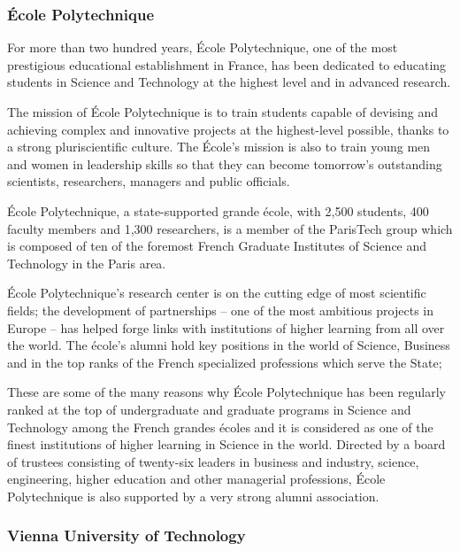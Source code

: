\documentclass[12pt]{article}
\begin{document}
\subsubsection{\'{E}cole Polytechnique}

For more than two hundred years, \'{E}cole Polytechnique, one of the most prestigious educational establishment in France,
has been dedicated to educating students in Science and Technology at the highest level and in advanced research.

The mission of \'{E}cole Polytechnique is to train students capable of devising and achieving
complex and innovative projects at the highest-level possible, thanks to a strong pluriscientific culture.
The \'{E}cole's mission is also to train young men and women in leadership skills so that
they can become tomorrow's outstanding scientists, researchers, managers and public officials.

\'{E}cole Polytechnique, a state-supported grande \'{e}cole, with 2,500 students, 400 faculty members
and 1,300 researchers, is a member of the ParisTech group which is composed of ten of the
foremost French Graduate Institutes of Science and Technology in the Paris area.

\'{E}cole Polytechnique's research center is on the cutting edge of most scientific fields; the development of partnerships -- one of the most ambitious projects in Europe -- has helped forge links with institutions of higher learning from all over the world.
 The \'ecole's alumni hold key positions in the world of Science, Business and in the top ranks of the French specialized professions which serve the State;


These are some of the many reasons why \'{E}cole Polytechnique has been regularly ranked at
the top of undergraduate and graduate programs in Science and Technology among the French
grandes \'{e}coles and it is considered as one of the finest institutions of higher learning in Science in the world.
Directed by a board of trustees consisting of twenty-six leaders in business and
industry, science, engineering, higher education and other managerial professions,
\'{E}cole Polytechnique is also supported by a very strong alumni association.

\subsubsection{Vienna University of Technology}
\end{document}
